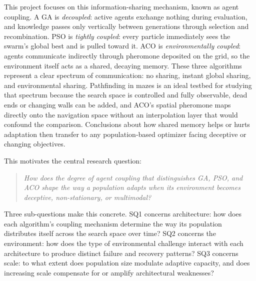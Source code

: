 \documentclass[11pt,a4paper]{article}
\begin{document}
    This project focuses on this information-sharing mechanism, known as agent coupling. A GA is \emph{decoupled}: active agents exchange nothing during evaluation, and knowledge passes only vertically between generations through selection and recombination. PSO is \emph{tightly coupled}: every particle immediately sees the swarm's global best and is pulled toward it. ACO is \emph{environmentally coupled}: agents communicate indirectly through pheromone deposited on the grid, so the environment itself acts as a shared, decaying memory. These three algorithms represent a clear spectrum of communication: no sharing, instant global sharing, and environmental sharing. Pathfinding in mazes is an ideal testbed for studying that spectrum because the search space is controlled and fully observable, dead ends or changing walls can be added, and ACO's spatial pheromone maps directly onto the navigation space without an interpolation layer that would confound the comparison. Conclusions about how shared memory helps or hurts adaptation then transfer to any population-based optimizer facing deceptive or changing objectives.

    This motivates the central research question:

    \begin{quote}
        \emph{How does the degree of agent coupling that distinguishes GA, PSO, and ACO shape the way a population adapts when its environment becomes deceptive, non-stationary, or multimodal?}
    \end{quote}

    \noindent Three sub-questions make this concrete. SQ1 concerns architecture: how does each algorithm's coupling mechanism determine the way its population distributes itself across the search space over time? SQ2 concerns the environment: how does the type of environmental challenge interact with each architecture to produce distinct failure and recovery patterns? SQ3 concerns scale: to what extent does population size modulate adaptive capacity, and does increasing scale compensate for or amplify architectural weaknesses?
\end{document}
